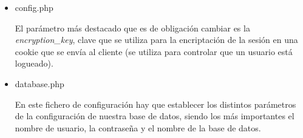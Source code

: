 \begin{itemize}
            \begin{itemize}
                \item config.php

                El parámetro más destacado que es de obligación cambiar es la \emph{encryption\_key}, clave que se utiliza para la encriptación de la sesión en una cookie que se envía al cliente (se utiliza para controlar que un usuario está logueado).

                \item database.php

                En este fichero de configuración hay que establecer los distintos parámetros de la configuración de nuestra base de datos, siendo los más importantes el nombre de usuario, la contraseña y el nombre de la base de datos.

            \end{itemize}

    \end{itemize}